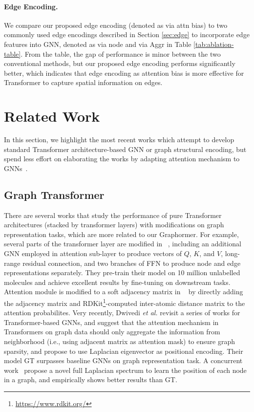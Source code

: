 \documentclass{article}
\begin{document}
\paragraph{Edge Encoding.} We compare our proposed edge encoding (denoted as via attn bias) to two commonly used edge encodings described in Section \ref{sec:edge} to incorporate edge features into GNN, denoted as via node and via Aggr in Table \ref{tab:ablation-table}. From the table, the gap of performance is minor between the two conventional methods, but our proposed edge encoding performs significantly better, which indicates that edge encoding as attention bias is more effective for Transformer to capture spatial information on edges.





\section{Related Work}
In this section, we highlight the most recent works which attempt to develop standard Transformer architecture-based GNN or graph structural encoding, but spend less effort on elaborating the works by adapting attention mechanism to GNNs~\cite{li2019graph,yun2019graph,cai2020graph,hu2020heterogeneous,baek2021accurate,velivckovic2018graph,wang2020direct,zhang2020graph,shi2020masked}.



\subsection{Graph Transformer}

There are several works that study the performance of pure Transformer architectures (stacked by transformer layers) with modifications on graph representation tasks, which are more related to our Graphormer. For example,  several parts of the transformer layer are modified in ~\cite{rong2020self}, including an additional GNN employed in attention sub-layer to produce vectors of $Q$, $K$, and $V$, long-range residual connection, and two branches of FFN to produce node and edge representations separately. They pre-train their model on 10 million unlabelled molecules and achieve excellent results by fine-tuning on downstream tasks. Attention module is modified to a soft adjacency matrix in ~\cite{maziarka2020molecule} by directly adding the adjacency matrix and RDKit\footnote{\url{https://www.rdkit.org/}}-computed inter-atomic distance matrix to the attention probabilites. Very recently, Dwivedi \textit{et al.} \cite{dwivedi2021generalization} revisit a series of works for Transformer-based GNNs, and suggest that the attention mechanism in Transformers on graph data should only aggregate the information from neighborhood (i.e., using adjacent matrix as attention mask) to ensure graph sparsity, and propose to use Laplacian eigenvector as positional encoding. Their model GT surpasses baseline GNNs on graph representation task. A concurrent work~\cite{Kreuzer2021rethinking} propose a novel full Laplacian spectrum to learn the position of each node in a graph, and empirically shows better results than GT.
\end{document}
